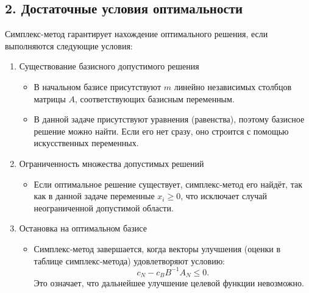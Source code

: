 \subsection*{2. Достаточные условия оптимальности}
Симплекс-метод гарантирует нахождение оптимального решения, если выполняются следующие условия:

\begin{enumerate}
    \item Существование базисного допустимого решения
    \begin{itemize}
        \item В начальном базисе присутствуют $m$ линейно независимых столбцов матрицы $A$, соответствующих базисным переменным.
        \item В данной задаче присутствуют уравнения (равенства), поэтому базисное решение можно найти. Если его нет сразу, оно строится с помощью искусственных переменных.
    \end{itemize}

    \item Ограниченность множества допустимых решений
    \begin{itemize}
        \item Если оптимальное решение существует, симплекс-метод его найдёт, так как в данной задаче переменные $x_i \geq 0$, что исключает случай неограниченной допустимой области.
    \end{itemize}


    \item Остановка на оптимальном базисе
    \begin{itemize}
        \item Симплекс-метод завершается, когда векторы улучшения (оценки в таблице симплекс-метода) удовлетворяют условию:
        $$c_N - c_B B^{-1} A_N \leq 0.$$
        Это означает, что дальнейшее улучшение целевой функции невозможно.
    \end{itemize}
\end{enumerate}

